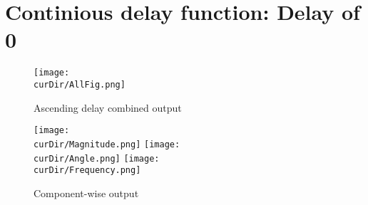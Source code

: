 \newpage
\newcommand{\curDir}{PMUsim-figures/Cont/DelayOf_0}
\section{Continious delay function: Delay of 0}
\begin{figure}[hb]
    \texttt{[image: \\curDir/AllFig.png]}    
    \caption{Ascending delay combined output}
    \label{fig:PMUsim-Asc6-allfig}
\end{figure}


     \begin{figure}
        \caption{Component-wise output}
 
    \texttt{[image: \\curDir/Magnitude.png]}    
         \label{fig:PMUsim-Asc6Mag}
   \texttt{[image: \\curDir/Angle.png]}    
         \label{fig:PMUsim-Asc6Ang}
   \texttt{[image: \\curDir/Frequency.png]}    
         \label{fig:PMUsim-Asc6Freq}
 
\end{figure}


